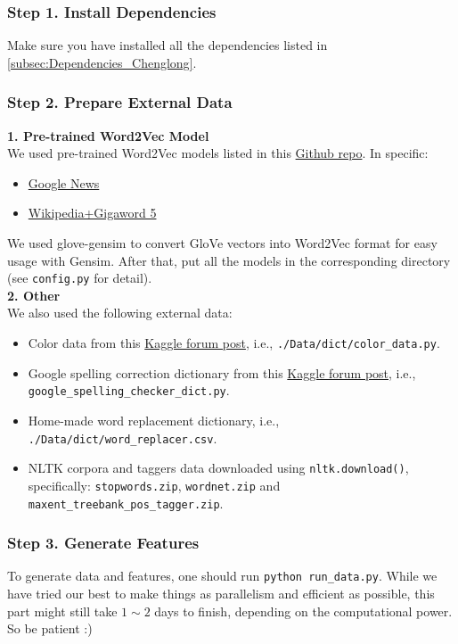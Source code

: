 \documentclass[12pt]{article}
\begin{document}
{{\begin{appendices}
\subsubsection{Step 1. Install Dependencies}
Make sure you have installed all the dependencies listed in \ref{subsec:Dependencies_Chenglong}.

\subsubsection{Step 2. Prepare External Data}
\textbf{1. Pre-trained Word2Vec Model}\\
We used pre-trained Word2Vec models listed in this \href{https://github.com/3Top/word2vec-api}{Github repo}. In specific:
\begin{itemize}
\item \href{https://drive.google.com/file/d/0B7XkCwpI5KDYNlNUTTlSS21pQmM/}{Google News}
\item \href{http://nlp.stanford.edu/data/glove.6B.zip}{Wikipedia+Gigaword 5}
\end{itemize}
We used glove-gensim\cite{glove-gensim} to convert GloVe vectors into Word2Vec format for easy usage with Gensim. After that, put all the models in the corresponding directory (see \texttt{config.py} for detail).\\
\textbf{2. Other}\\
We also used the following external data:
\begin{itemize}
\item Color data from this \href{https://www.kaggle.com/c/home-depot-product-search-relevance/forums/t/18967/data-preparation}{Kaggle forum post}, i.e., \texttt{./Data/dict/color\_data.py}.
\item Google spelling correction dictionary from this \href{https://www.kaggle.com/steubk/home-depot-product-search-relevance/fixing-typos}{Kaggle forum post}, i.e.,\\\texttt{google\_spelling\_checker\_dict.py}.
\item Home-made word replacement dictionary, i.e., \texttt{./Data/dict/word\_replacer.csv}.
\item NLTK corpora and taggers data downloaded using \texttt{nltk.download()}, specifically: \texttt{stopwords.zip}, \texttt{wordnet.zip} and \texttt{maxent\_treebank\_pos\_tagger.zip}.
\end{itemize}

\subsubsection{Step 3. Generate Features}
To generate data and features, one should run \texttt{python run\_data.py}. While we have tried our best to make things as parallelism and efficient as possible, this part might still take $1\sim 2$ days to finish, depending on the computational power. So be patient :)


\end{appendices}}}
\end{document}

